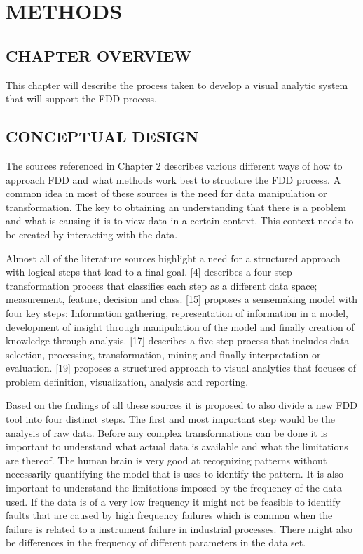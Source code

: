 
\chapter{METHODS}

\section{CHAPTER OVERVIEW}

This chapter will describe the process taken to develop a visual analytic system that will support the FDD process.

\section{CONCEPTUAL DESIGN}

The sources referenced in Chapter 2 describes various different ways of how to approach FDD and what methods work best to structure the FDD process. A common idea in most of these sources is the need for data manipulation or transformation. The key to obtaining an understanding that there is a problem and what is causing it is to  view data in a certain context. This context needs to be created by interacting with the data. 

Almost all of the literature sources highlight a need for a structured approach with logical steps that lead to a final goal. [4] describes a four step transformation process that classifies each step as a different data space; measurement, feature, decision and class. [15] proposes a sensemaking model with four key steps: Information gathering, representation of information in a model, development of insight through manipulation of the model and finally creation of knowledge through analysis. [17] describes a five step process that includes data selection, processing, transformation, mining and finally interpretation or evaluation. [19] proposes a structured approach to visual analytics that focuses of problem definition, visualization, analysis and reporting.

Based on the findings of all these sources it is proposed to also divide a new FDD tool into four distinct steps. The first and most important step would be the analysis of raw data. Before any complex transformations can be done it is important to understand what actual data is available and what the limitations are thereof. The human brain is very good at recognizing patterns without necessarily quantifying the model that is uses to identify the pattern. It is also important to understand the limitations imposed by the frequency of the data used. If the data is of a very low frequency it might not be feasible to identify faults that are caused by high frequency failures which is common when the failure is related to a instrument failure in industrial processes. There might also be differences in the frequency of different parameters in the data set. 

